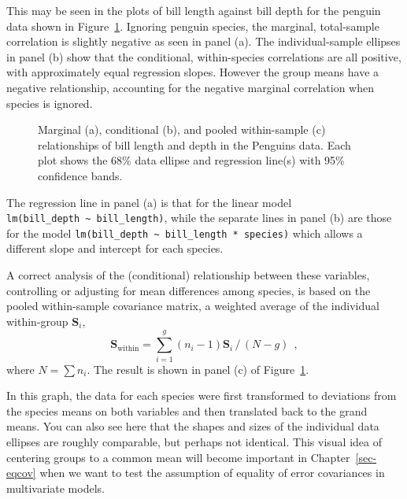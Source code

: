 \documentclass[
  letterpaper,
  10pt,
  krantz2]{krantz}
\begin{document}
{This may be seen in the plots of bill length against bill depth for the
penguin data shown in Figure~\ref{fig-peng-simpsons}. Ignoring penguin
species, the marginal, total-sample correlation is slightly negative as
seen in panel (a). The individual-sample ellipses in panel (b) show that
the conditional, within-species correlations are all positive, with
approximately equal regression slopes. However the group means have a
negative relationship, accounting for the negative marginal correlation
when species is ignored.

\begin{figure}


\caption{\label{fig-peng-simpsons}Marginal (a), conditional (b), and
pooled within-sample (c) relationships of bill length and depth in the
Penguins data. Each plot shows the 68\% data ellipse and regression
line(s) with 95\% confidence bands.}

\end{figure}%

The regression line in panel (a) is that for the linear model
\texttt{lm(bill\_depth\ \textasciitilde{}\ bill\_length)}, while the
separate lines in panel (b) are those for the model
\texttt{lm(bill\_depth\ \textasciitilde{}\ bill\_length\ *\ species)}
which allows a different slope and intercept for each species.

A correct analysis of the (conditional) relationship between these
variables, controlling or adjusting for mean differences among species,
is based on the pooled within-sample covariance matrix, a weighted
average of the individual within-group \(\mathbf{S}_i\), \[
\mathbf{S}_{\textrm{within}}  =
\sum_{i=1}^g
(n_i - 1) \mathbf{S}_i \, / \, (N - g)
\:\: ,
\] where \(N = \sum n_i\). The result is shown in panel (c) of
Figure~\ref{fig-peng-simpsons}.

In this graph, the data for each species were first transformed to
deviations from the species means on both variables and then translated
back to the grand means. You can also see here that the shapes and sizes
of the individual data ellipses are roughly comparable, but perhaps not
identical. This visual idea of centering groups to a common mean will
become important in Chapter~\ref{sec-eqcov} when we want to test the
assumption of equality of error covariances in multivariate models.

}
\end{document}
